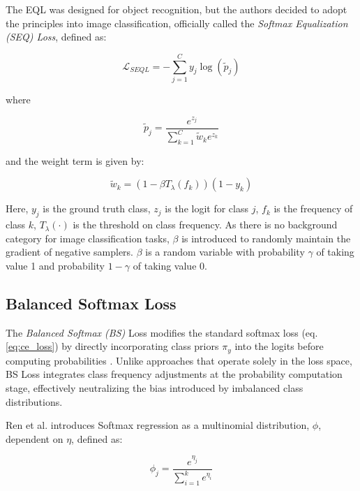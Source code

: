 \noindent The EQL was designed for object recognition, but the authors decided to adopt the principles into image classification, officially called the \emph{Softmax Equalization (SEQ) Loss}, defined as: 

\begin{equation}
    \label{eq:EQ_loss}
    \mathcal{L}_{SEQL} = - \sum_{j=1}^{C} y_j \log(\tilde{p}_j)
\end{equation}

\noindent where

\begin{equation}
    \tilde{p}_j = \frac{e^{z_j}}{\sum_{k=1}^{C} \tilde{w}_k e^{z_k}}
\end{equation}

\noindent and the weight term is given by:

\begin{equation}
    \tilde{w}_k = (1 - \beta T_\lambda(f_k))(1 - y_k)
\end{equation}

\noindent Here, $y_j$ is the ground truth class, $z_j$ is the logit for class $j$, $f_k$ is the frequency of class $k$, \(T_\lambda(\cdot)\) is the threshold on class frequency. As there is no background category for image classification tasks, $\beta$ is introduced to randomly maintain the gradient of negative samplers. \(\beta\) is a random variable with probability \(\gamma\) of taking value 1 and probability \(1 - \gamma\) of taking value 0.


\subsection{Balanced Softmax Loss}
\label{sec:bs_loss}
The \emph{Balanced Softmax (BS)} Loss modifies the standard softmax loss (eq. \eqref{eq:ce_loss}) by directly incorporating class priors $\pi_y$ into the logits before computing probabilities \cite{ren2020balancedmetasoftmaxlongtailedvisual}. Unlike approaches that operate solely in the loss space, BS Loss integrates class frequency adjustments at the probability computation stage, effectively neutralizing the bias introduced by imbalanced class distributions. 

Ren et al. \cite{ren2020balancedmetasoftmaxlongtailedvisual} introduces Softmax regression as a multinomial distribution, $\phi$, dependent on $\eta$, defined as:

\begin{equation}
    \phi_j = \frac{e^{\eta_j}}{\sum_{i=1}^{k}e^{\eta_i}}
\end{equation}

